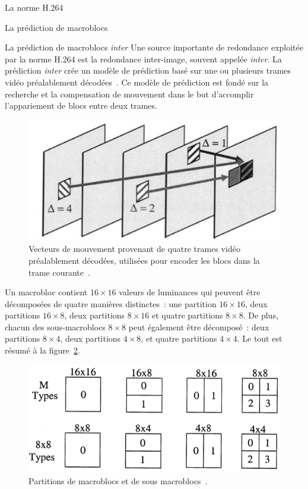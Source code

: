 \documentclass[letterpaper, twoside, 12pt,memoire]{thETS}
\begin{document}
\begin{chapter}{La norme H.264}
\begin{section}{La prédiction de macroblocs}
\begin{subsection}{La prédiction de macroblocs \textit{inter}}
\newcommand{\ltMIN}[1]{\arg \min_{#1}}
\newcommand{\ltSAD}[1]{\textrm{SAD}(#1)}
\newcommand{\ltC}[1]{\mathbf{C}_{#1}}
\newcommand{\ltR}[1]{\mathbf{R}_{#1}}
Une source importante de redondance exploitée par la norme H.264 est la
redondance inter-image, souvent appelée \textit{inter}. La prédiction
\textit{inter} crée un modèle de prédiction basé sur une ou plusieurs trames
vidéo préalablement décodées~\citep{richardson2003}. Ce modèle de prédiction est
fondé sur la recherche et la compensation de mouvement dans le but d'accomplir
l'appariement de blocs entre deux trames.

\begin{figure}[htb]
\centering
\includegraphics[scale=0.5]{images/multipicture.png}
\caption{Vecteurs de mouvement provenant de quatre trames vidéo préalablement
décodées, utilisées pour encoder les blocs dans la trame
courante~\citep{schafer2003}.}
\label{fig-MultiPicture}
\end{figure}

Un macrobloc contient $16 \times 16$ valeurs de luminances qui peuvent être
décomposées de quatre manières distinctes~: une partition $16 \times 16$, deux
partitions $16 \times 8$, deux partitions $8 \times 16$ et quatre partitions $8
\times 8$. De plus, chacun des sous-macroblocs $8 \times 8$ peut également être
décomposé~: deux partitions $8 \times 4$, deux partitions $4 \times 8$, et
quatre partitions  $4 \times 4$. Le tout est résumé à la
figure~\ref{fig-MacroblockPartitions}.

\begin{figure}[htb]
\centering
\includegraphics[scale=0.5]{images/MacroblockPartitions.png}
\caption{Partitions de macroblocs et de sous macroblocs~\citep{schafer2003}.}
\label{fig-MacroblockPartitions}
\end{figure}


\end{subsection}
\end{section}
\end{chapter}
\end{document}
